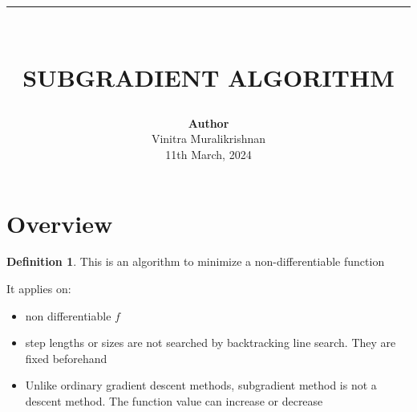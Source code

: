 \documentclass{article}
\newcommand{\HRule}[1]{\rule{\linewidth}{#1}}
\theoremstyle{definition}
\newtheorem{definition}{Definition}[section]
\theoremstyle{remark}
\begin{document}

\title{ \normalsize \textsc{}
		\\ [2.0cm]
		\HRule{1.5pt} \\
		\LARGE \textbf{\uppercase{Subgradient Algorithm}
        \vspace*{10\baselineskip}}
		}
\date{}
\author{\textbf{Author} \\ 
		Vinitra Muralikrishnan \\
		11th March, 2024}

\maketitle
\newpage

\tableofcontents
\newpage


\section{Overview}

\begin{definition}
    This is an algorithm to minimize a non-differentiable function
\end{definition}

It applies on:
\begin{itemize}
    \item non differentiable $f$
    \item step lengths or sizes are not searched by backtracking line search. They are fixed beforehand
    \item Unlike ordinary gradient descent methods, subgradient method is not a descent method. The function
    value can increase or decrease
\end{itemize}
\end{document}

